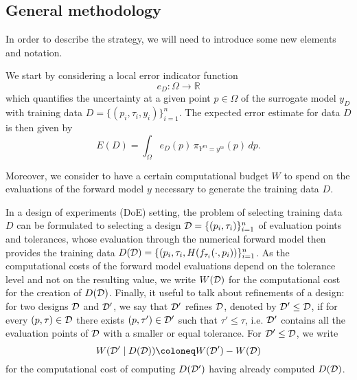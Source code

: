 \subsection{General methodology}\label{sec:AL-method}

In order to describe the strategy, we will need to introduce some new elements and notation. \medbreak 

We start by considering a local error indicator function 
\begin{equation} \label{eq:loc-err-ind}
    e_{D} : \Omega \to \mathbb R
\end{equation} 
which quantifies the uncertainty at a given point $p \in \Omega$ of the surrogate model $y_D$ with training data $D=\{(p_i, \tau_i, y_i)\}_{i=1}^n$.
The expected error estimate for data $D$ is then given by
\begin{equation} \label{eq:glob-err-ind}
    E(D) = \int_{\Omega} e_{D}(p) \, \pi_{ Y^m = y^m}(p) \, dp.
\end{equation}

Moreover, we consider to have a certain computational budget $W$ to spend on the evaluations of the forward model $y$ necessary to generate the training data $D$. \medbreak 

In a design of experiments (DoE) setting, the problem of selecting training data $D$ can be formulated to selecting a design $\mathcal D = \{ (p_i, \tau_i) \}_{i=1}^n$ of evaluation points and tolerances, whose evaluation through the numerical forward model then provides the training data $D(\mathcal D) = \{ (p_i, \tau_i, H(f_{\tau_i}(\cdot, p_i)) \}_{i=1}^n$. \newline
As the computational costs of the forward model evaluations depend on the tolerance level and not on the resulting value, we write $W(\mathcal D)$ for the computational cost for the creation of $D(\mathcal D)$. \newline
Finally, it useful to talk about refinements of a design: for two designs $\mathcal D$ and $\mathcal D'$, we say that $\mathcal D'$ refines $\mathcal D$, denoted by $\mathcal D' \leq \mathcal D$, if for every $(p, \tau) \in \mathcal D$ there exists $(p, \tau') \in \mathcal D'$ such that $\tau' \leq \tau$, i.e.  $\mathcal D'$ contains all the evaluation points of $\mathcal D$ with a smaller or equal tolerance.
For $\mathcal D' \leq \mathcal D$, we write 
\[ 
W(\mc D' \mid D(\mc D)) \coloneq W(\mc D') - W(\mc D)
\] for the computational cost of computing $D(\mathcal D')$ having already computed $D(\mathcal D)$. \medbreak

